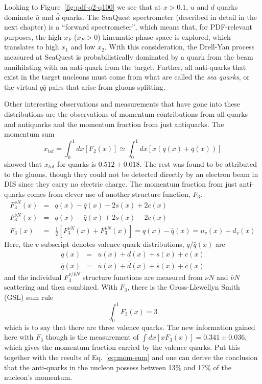 Looking to Figure~\ref{fig:pdf-q2-q100} we see that at $x>0.1$, $u$ and $d$ quarks dominate $\bar{u}$ and $\bar{d}$ quarks. The SeaQuest spectrometer (described in detail in the next chapter) is a ``forward spectrometer'', which means that, for PDF-relevant purposes, the high-$x_F$ ($x_F>0$) kinematic phase space is explored, which translates to high $x_1$ and low $x_2$. With this consideration, the Drell-Yan process measured at SeaQuest is probabilistically dominated by a quark from the beam annihilating with an anti-quark from the target. Further, all anti-quarks that exist in the target nucleons must come from what are called the \emph{sea quarks}, or the virtual $q\bar{q}$ pairs 
that arise from gluons splitting. 

Other interesting observations and measurements that have gone into these distributions are the observations of momentum contributions from all quarks and antiquarks and the momentum fraction from just antiquarks. The momentum sum
\begin{equation}
x_{tot} = \int_0^1 dx [F_2(x)] \simeq \int_0^1 dx [x(q(x) + \bar{q}(x))] \label{eq:mom-sum}
\end{equation}
showed that $x_{tot}$ for quarks is $0.512 \pm 0.018$\CN. The rest was found to be attributed to the gluons, though they could not be detected directly by an electron beam in DIS since they carry no electric charge. The momentum fraction from just anti-quarks comes from clever use of another structure function, $F_3$.
\begin{eqnarray}
F_3^{\nu N}(x) & = & q(x) - \bar{q}(x) - 2s(x) + 2c(x) \\
F_3^{\bar{\nu} N}(x) & = & q(x) - \bar{q}(x) + 2s(x) - 2c(x) \\
F_3(x) & = & \frac{1}{2} [F_3^{\nu N}(x) + F_3^{\bar{\nu} N}(x)] = q(x) - \bar{q}(x) = u_v(x) + d_v(x)
\end{eqnarray}
Here, the $v$ subscript denotes valence quark distributions, $q/\bar{q}(x)$ are
\begin{eqnarray}
q(x) & = & u(x) + d(x) + s(x) + c(x) \\
\bar{q}(x) & = & \bar{u}(x) + \bar{d}(x) + \bar{s}(x) + \bar{c}(x)
\end{eqnarray}
and the individual $F_3^{\nu/\bar{\nu}N}$ structure functions are measured from $\nu N$ and $\bar{\nu} N$ scattering and then combined\CN. With $F_3$, there is the Gross-Llewellyn Smith (GSL) sum rule\cite{Gross:1969jf}
\begin{equation}
\int_0^1 F_3(x) = 3
\end{equation}
which is to say that there are three valence quarks. The new information gained here with $F_3$ though is the measurement of $\int dx [xF_3(x)] = 0.341 \pm 0.036$, which gives the momentum fraction carried by the valence quarks. Put this together with the results of Eq.~\ref{eq:mom-sum} and one can derive the conclusion that the anti-quarks in the nucleon possess between 13\% and 17\% of the nucleon's momentum\cite{Fisk:1982pn}.

